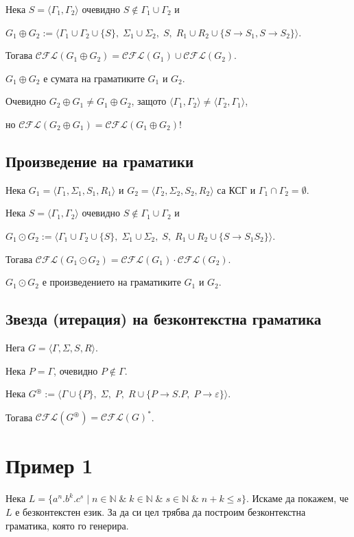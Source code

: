 \documentclass[12pt]{article}
\begin{document}
Нека \(S = \langle \Gamma_1, \Gamma_2 \rangle\) очевидно \(S \notin \Gamma_1 \cup \Gamma_2\) и

\(G_1 \oplus G_2 := \langle \Gamma_1 \cup \Gamma_2 \cup \{S\},\; \Sigma_1 \cup \Sigma_2,\; S,\; R_1 \cup R_2 \cup \{S \to S_1, S \to S_2\} \rangle\).

Тогава \(\mathcal{CFL}(G_1 \oplus G_2) = \mathcal{CFL}(G_1) \cup \mathcal{CFL}(G_2)\).

\(G_1 \oplus G_2\) е сумата на граматиките \(G_1\) и \(G_2\).

Очевидно \(G_2 \oplus G_1 \neq G_1 \oplus G_2\), защото 
\(\langle \Gamma_1, \Gamma_2 \rangle \neq \langle \Gamma_2, \Gamma_1 \rangle\),

но \(\mathcal{CFL}(G_2 \oplus G_1) = \mathcal{CFL}(G_1 \oplus G_2)\)!

\subsection*{Произведение на граматики}
Нека \(G_1 = \langle \Gamma_1, \Sigma_1, S_1, R_1 \rangle\) и \(G_2 = \langle \Gamma_2, \Sigma_2, S_2, R_2 \rangle\) са КСГ и \(\Gamma_1 \cap \Gamma_2 = \emptyset\).


Нека \(S = \langle \Gamma_1, \Gamma_2 \rangle\) очевидно \(S \notin \Gamma_1 \cup \Gamma_2\) и


\(G_1 \odot G_2 := \langle \Gamma_1 \cup \Gamma_2 \cup \{S\},\; \Sigma_1 \cup \Sigma_2,\; S,\; R_1 \cup R_2 \cup \{S \to S_1S_2\} \rangle\).

Тогава \(\mathcal{CFL}(G_1 \odot G_2) = \mathcal{CFL}(G_1) \cdot \mathcal{CFL}(G_2)\).

\(G_1 \odot G_2\) е произведението на граматиките \(G_1\) и \(G_2\).

\subsection*{Звезда (итерация) на безконтекстна граматика}

Нега \(G =  \langle \Gamma, \Sigma, S, R \rangle\).

Нека \(P = \Gamma\), очевидно \(P \notin \Gamma\).

Нека \(G^\circledast := \langle \Gamma \cup \{P\},\; \Sigma,\; P,\; R \cup \{P \to S.P,\; P \to \varepsilon\} \rangle\).

Тогава \(\mathcal{CFL}(G^\circledast) = \mathcal{CFL}(G)^*\).

\section*{Пример 1}
Нека \(L = \{a^n.b^k.c^s \mid n \in \mathbb{N} \;\&\; k \in \mathbb{N} \;\&\; s \in \mathbb{N} \;\&\; n + k \leq s\}\).
Искаме да покажем, че \(L\) е безконтекстен език. За да си цел трябва да построим безконтекстна граматика, която го генерира.
\end{document}
